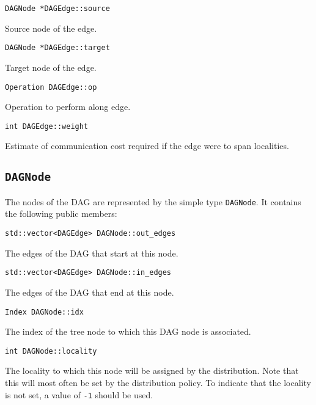 \begin{lstlisting}
DAGNode *DAGEdge::source
\end{lstlisting}

\noindent Source node of the edge.

\begin{lstlisting}
DAGNode *DAGEdge::target
\end{lstlisting}

\noindent Target node of the edge.

\begin{lstlisting}
Operation DAGEdge::op
\end{lstlisting}

\noindent Operation to perform along edge.

\begin{lstlisting}
int DAGEdge::weight
\end{lstlisting}

\noindent Estimate of communication cost required if the edge were to span
localities.


\subsection{\texttt{DAGNode}}

The nodes of the DAG are represented by the simple type \texttt{DAGNode}. It
contains the following public members:

\begin{lstlisting}
std::vector<DAGEdge> DAGNode::out_edges
\end{lstlisting}

\noindent The edges of the DAG that start at this node.

\begin{lstlisting}
std::vector<DAGEdge> DAGNode::in_edges
\end{lstlisting}

\noindent The edges of the DAG that end at this node.

\begin{lstlisting}
Index DAGNode::idx
\end{lstlisting}

\noindent The index of the tree node to which this DAG node is associated.

\begin{lstlisting}
int DAGNode::locality
\end{lstlisting}

\noindent The locality to which this node will be assigned by the
distribution. Note that this will most often be set by the distribution policy.
To indicate that the locality is not set, a value of \texttt{-1} should be used.

